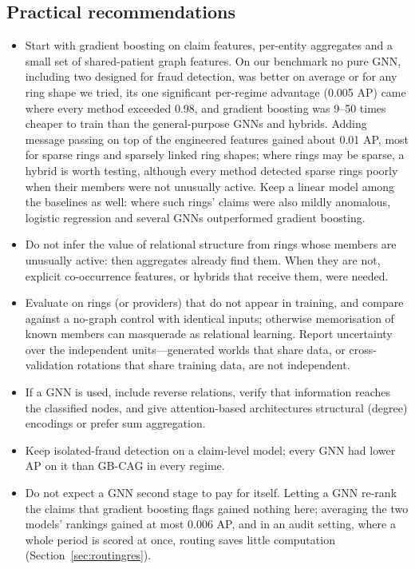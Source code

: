 \documentclass[pdflatex,sn-vancouver-num]{sn-jnl}
\begin{document}
\subsection{Practical recommendations}
\begin{itemize}
\item Start with gradient boosting on claim features, per-entity aggregates
  and a small set of shared-patient graph features. On our benchmark no pure
  GNN, including two designed for fraud detection, was better on average or
  for any ring shape we tried, its one significant per-regime advantage
  (0.005 AP) came where every method exceeded 0.98, and gradient boosting was
  9--50 times cheaper to train than the general-purpose GNNs and hybrids.
  Adding message passing on top of the engineered features gained about
  0.01 AP, most for sparse rings and sparsely linked ring shapes; where rings
  may be sparse, a hybrid is worth testing,
  although every method detected sparse rings poorly when their members were
  not unusually active. Keep a linear model among the baselines as well:
  where such rings' claims were also mildly anomalous, logistic regression
  and several GNNs outperformed gradient boosting.
\item Do not infer the value of relational structure from rings whose members
  are unusually active: then aggregates already find them. When they are not,
  explicit co-occurrence features, or hybrids that receive them, were needed.
\item Evaluate on rings (or providers) that do not appear in training, and
  compare against a no-graph control with identical inputs; otherwise
  memorisation of known members can masquerade as relational learning.
  Report uncertainty over the independent units---generated worlds that
  share data, or cross-validation rotations that share training data, are
  not independent.
\item If a GNN is used, include reverse relations, verify that information
  reaches the classified nodes, and give attention-based architectures
  structural (degree) encodings or prefer sum aggregation.
\item Keep isolated-fraud detection on a claim-level model; every GNN
  had lower AP on it than GB-CAG in every regime.
\item Do not expect a GNN second stage to pay for itself. Letting a GNN
  re-rank the claims that gradient boosting flags gained nothing here;
  averaging the two models' rankings gained at most 0.006 AP, and in an audit
  setting, where a whole period is scored at once, routing saves little
  computation (Section~\ref{sec:routingres}).
\end{itemize}
\end{document}
